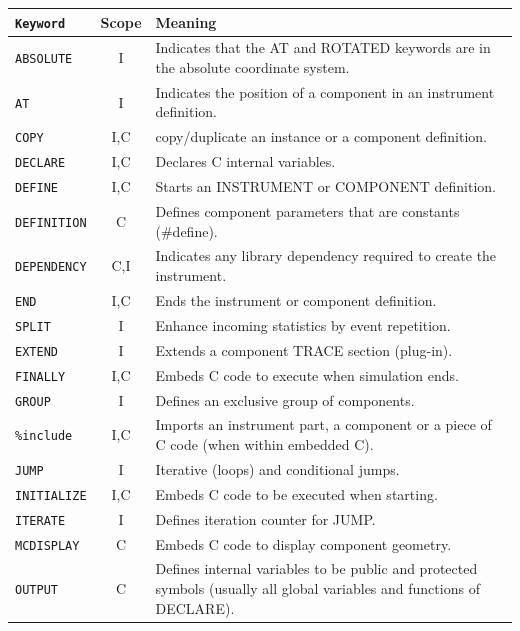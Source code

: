 \begin{table}
  \begin{center}
    {\let\my=\\
    \begin{tabular}{|l|c|p{}|}
      \hline
      \texttt{Keyword} & Scope & Meaning \\
      \hline
      \texttt{ABSOLUTE} & I & Indicates that the AT and ROTATED keywords are in the absolute coordinate system. \\
      \texttt{AT} & I & Indicates the position of a component in an instrument definition. \\
      \texttt{COPY}& I,C & copy/duplicate an instance or a component definition. \\
      \texttt{DECLARE} & I,C & Declares C internal variables. \\
      \texttt{DEFINE} & I,C & Starts an INSTRUMENT or COMPONENT definition. \\
      \texttt{DEFINITION} & C & Defines component parameters that are constants (\#define). \\
      \texttt{DEPENDENCY} & C,I & Indicates any library dependency required to create the instrument. \\
      \texttt{END} & I,C & Ends the instrument or component definition. \\
      \texttt{SPLIT} & I & Enhance incoming statistics by event repetition. \\
      \texttt{EXTEND} & I & Extends a component TRACE section (plug-in). \\
      \texttt{FINALLY} & I,C & Embeds C code to execute when simulation ends. \\
      \texttt{GROUP} & I & Defines an exclusive group of components. \\
      \texttt{\%include} & I,C & Imports an instrument part, a component or a piece of C code (when within embedded C). \\
      \texttt{JUMP} & I & Iterative (loops) and conditional jumps. \\
      \texttt{INITIALIZE} & I,C & Embeds C code to be executed when starting. \\
      \texttt{ITERATE} & I & Defines iteration counter for JUMP. \\
      \texttt{MCDISPLAY} & C & Embeds C code to display component geometry. \\
      \texttt{OUTPUT} & C & Defines internal variables to be public and protected symbols (usually all global variables and functions of DECLARE).\\

\end{tabular}}
\end{center}
\end{table}
